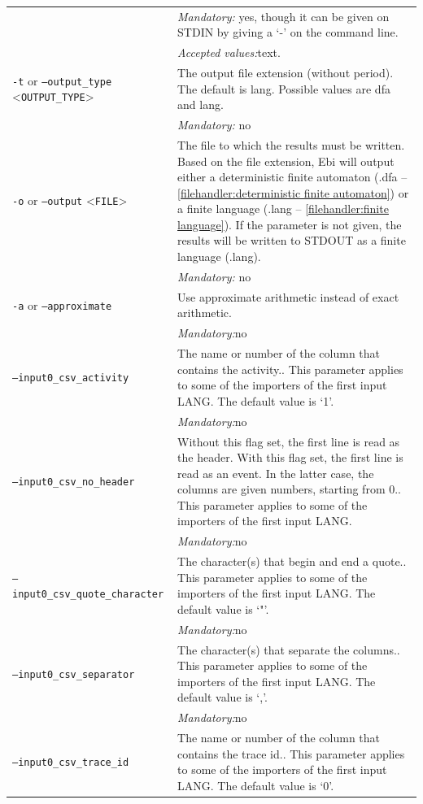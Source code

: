 {\begin{tabularx}{\linewidth}{lX}
&\textit{Mandatory:} \quad yes, though it can be given on STDIN by giving a `-' on the command line.\\
&\textit{Accepted values:}\quad text.\\
\texttt{-t} or \texttt{--output\_type} <\texttt{OUTPUT\_TYPE}> &
The output file extension (without period). The default is lang. Possible values are dfa and lang.\\
&\textit{Mandatory:} \quad no\\
\texttt{-o} or \texttt{--output} <\texttt{FILE}> &
The file to which the results must be written. Based on the file extension, Ebi will output either a deterministic finite automaton (.dfa -- \cref{filehandler:deterministic finite automaton}) or a finite language (.lang -- \cref{filehandler:finite language}).
If the parameter is not given, the results will be written to STDOUT as a finite language (.lang).\\
&\textit{Mandatory:} \quad no\\
\texttt{-a} or \texttt{--approximate} & Use approximate arithmetic instead of exact arithmetic.\\
&\textit{Mandatory:}\quad no\\
\texttt{--input0\_csv\_activity} & The name or number of the column that contains the activity.. This parameter applies to some of the importers of the first input LANG. The default value is `1'.\\
&\textit{Mandatory:}\quad no\\
\texttt{--input0\_csv\_no\_header} & Without this flag set, the first line is read as the header. 
    With this flag set, the first line is read as an event. In the latter case, the columns are given numbers, starting from 0.. This parameter applies to some of the importers of the first input LANG. \\
&\textit{Mandatory:}\quad no\\
\texttt{--input0\_csv\_quote\_character} & The character(s) that begin and end a quote.. This parameter applies to some of the importers of the first input LANG. The default value is `"'.\\
&\textit{Mandatory:}\quad no\\
\texttt{--input0\_csv\_separator} & The character(s) that separate the columns.. This parameter applies to some of the importers of the first input LANG. The default value is `,'.\\
&\textit{Mandatory:}\quad no\\
\texttt{--input0\_csv\_trace\_id} & The name or number of the column that contains the trace id.. This parameter applies to some of the importers of the first input LANG. The default value is `0'.\\

\end{tabularx}}
